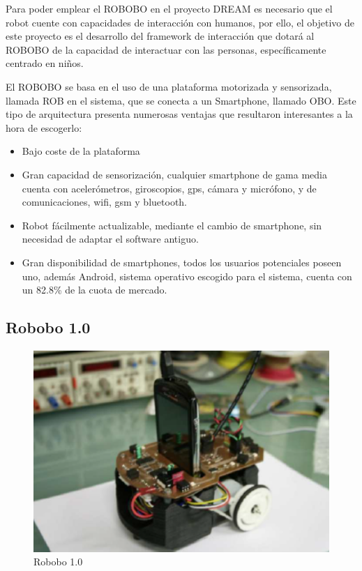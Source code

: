   Para poder emplear el ROBOBO en el proyecto DREAM es necesario que el robot cuente con capacidades de interacción con humanos, por ello, el objetivo de este proyecto es el desarrollo del framework de interacción que dotará al ROBOBO de la capacidad de interactuar con las personas, específicamente centrado en niños.
  
 El ROBOBO se basa en el uso de una plataforma motorizada y sensorizada, llamada ROB en el sistema, que se conecta a un Smartphone, llamado OBO. Este tipo de arquitectura presenta numerosas ventajas que resultaron interesantes a la hora de escogerlo:
 \begin{itemize}
 	\item Bajo coste de la plataforma
 	\item Gran capacidad de sensorización, cualquier smartphone de gama media cuenta con acelerómetros, giroscopios, gps, cámara y micrófono, y de comunicaciones, wifi, gsm y bluetooth.
 	\item Robot fácilmente actualizable, mediante el cambio de smartphone, sin necesidad de adaptar el software antiguo.
 	\item Gran disponibilidad de smartphones, todos los usuarios potenciales poseen uno, además Android, sistema operativo escogido para el sistema, cuenta con un 82.8\% de la cuota de mercado.
 \end{itemize}

\subsection{Robobo 1.0}
\begin{figure}
	\centering
	\includegraphics[width=0.8\linewidth]{imagenes/robobo1_0.PNG}
	\caption{Robobo 1.0}
	\label{fig:robobo_1_0}
\end{figure}

